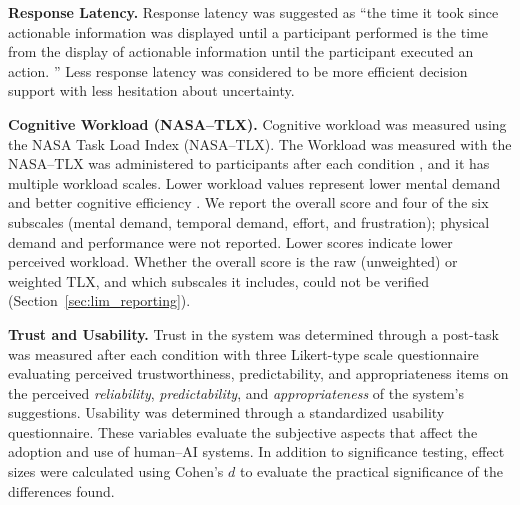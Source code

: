 \documentclass[journal]{IEEEtran}
\theoremstyle{plain}
\theoremstyle{definition}
\providecommand{\DIFaddtex}[1]{{\protect\color{blue} \sf #1}} %
\providecommand{\DIFdeltex}[1]{{\protect\color{red} \scriptsize #1}} %
\providecommand{\DIFaddbegin}{} %
\providecommand{\DIFaddend}{} %
\providecommand{\DIFdelbegin}{} %
\providecommand{\DIFdelend}{} %
\providecommand{\DIFadd}[1]{\texorpdfstring{\DIFaddtex{#1}}{#1}} %
\providecommand{\DIFdel}[1]{\texorpdfstring{\DIFdeltex{#1}}{}} %
\newcommand{\DIFscaledelfig}{0.5}
\newlength{\DIFdelgraphicswidth} %
\newlength{\DIFdelgraphicsheight} %
\newcommand{\DIFaddincludegraphics}[2][]{{\color{blue}\fbox{\DIFOincludegraphics[#1]{#2}}}} %
\newcommand{\DIFdelincludegraphics}[2][]{%
\sbox{\DIFdelgraphicsbox}{\DIFOincludegraphics[#1]{#2}}%
\settoboxwidth{\DIFdelgraphicswidth}{\DIFdelgraphicsbox} %
\settoboxtotalheight{\DIFdelgraphicsheight}{\DIFdelgraphicsbox} %
\scalebox{\DIFscaledelfig}{%
\parbox[b]{\DIFdelgraphicswidth}{\usebox{\DIFdelgraphicsbox}\\[-\baselineskip] \rule{\DIFdelgraphicswidth}{0em}}\llap{\resizebox{\DIFdelgraphicswidth}{\DIFdelgraphicsheight}{%
\setlength{\unitlength}{\DIFdelgraphicswidth}%
\begin{picture}(1,1)%
\thicklines\linethickness{2pt} %
{\color[rgb]{1,0,0}\put(0,0){\framebox(1,1){}}}%
{\color[rgb]{1,0,0}\put(0,0){\line( 1,1){1}}}%
{\color[rgb]{1,0,0}\put(0,1){\line(1,-1){1}}}%
\end{picture}%
}\hspace*{3pt}}} %
} %
\DeclareRobustCommand{\DIFaddbegin}{\DIFOaddbegin \let\includegraphics\DIFaddincludegraphics} %
\DeclareRobustCommand{\DIFaddend}{\DIFOaddend \let\includegraphics\DIFOincludegraphics} %
\DeclareRobustCommand{\DIFdelbegin}{\DIFOdelbegin \let\includegraphics\DIFdelincludegraphics} %
\DeclareRobustCommand{\DIFdelend}{\DIFOaddend \let\includegraphics\DIFOincludegraphics} %
\begin{document}
    \textbf{Response Latency.}
    Response latency \DIFdelbegin \DIFdel{was suggested as “the time it took since actionable information was displayed until a participant performed }\DIFdelend \DIFaddbegin \DIFadd{is the time from the display of actionable information until the participant executed }\DIFaddend an action.
\DIFdelbegin \DIFdel{” Less response latency was considered to be more efficient decision support with less hesitation about uncertainty.
}\DIFdelend 

    \textbf{Cognitive Workload\DIFdelbegin \DIFdel{(NASA--TLX)}\DIFdelend .}
    \DIFdelbegin \DIFdel{Cognitive workload was measured using the NASA Task Load Index (NASA--TLX). The }\DIFdelend \DIFaddbegin \DIFadd{Workload was measured with the }\DIFaddend NASA--TLX \DIFdelbegin \DIFdel{was administered to participants }\DIFdelend \DIFaddbegin \DIFadd{\cite{Hart1988} }\DIFaddend after each condition\DIFdelbegin \DIFdel{, and it has multiple workload scales. Lower workload values represent lower mental demand and better cognitive efficiency}\DIFdelend \DIFaddbegin \DIFadd{. We report the overall score and four of the six subscales (mental demand, temporal demand, effort, and frustration); physical demand and performance were not reported. Lower scores indicate lower perceived workload. Whether the overall score is the raw (unweighted) or weighted TLX, and which subscales it includes, could not be verified (Section~\ref{sec:lim_reporting})}\DIFaddend .

    \textbf{Trust\DIFdelbegin \DIFdel{and Usability}\DIFdelend .}
    Trust \DIFdelbegin \DIFdel{in the system was determined through a post-task }\DIFdelend \DIFaddbegin \DIFadd{was measured after each condition with three }\DIFaddend Likert-type \DIFdelbegin \DIFdel{scale questionnaire evaluating perceived trustworthiness, predictability, and appropriateness }\DIFdelend \DIFaddbegin \DIFadd{items on the perceived \emph{reliability}, \emph{predictability}, and \emph{appropriateness} }\DIFaddend of the system's \DIFdelbegin \DIFdel{suggestions. Usability was determined through a standardized usability questionnaire. These variables evaluate the subjective aspects that affect the adoption and use of human--AI systems. In addition to significance testing, effect sizes were calculated using Cohen's $d$ to evaluate the practical significance of the differences found. }%

\end{document}
